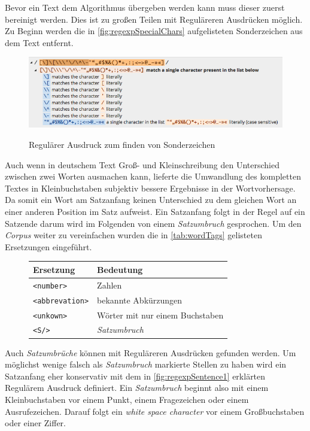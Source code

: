         Bevor ein Text dem Algorithmus übergeben werden kann muss dieser zuerst bereinigt werden. Dies ist zu großen Teilen mit Reguläreren Ausdrücken möglich. Zu Beginn werden die in \autoref{fig:regexpSpecialChars} aufgelisteten Sonderzeichen aus dem Text entfernt.
            
        \begin{figure}[H]
            \centering
            \includegraphics[width=0.8\linewidth]{images/regexpSpecialChars.png}
  			\caption{Regulärer Ausdruck zum finden von Sonderzeichen} \parencite{regex101:specialChars}
			\label{fig:regexpSpecialChars}
		\end{figure}
            
		Auch wenn in deutschem Text Groß- und Kleinschreibung den Unterschied zwischen zwei Worten ausmachen kann, lieferte die Umwandlung des kompletten Textes in Kleinbuchstaben subjektiv bessere Ergebnisse in der Wortvorhersage. Da somit ein Wort am Satzanfang keinen Unterschied zu dem gleichen Wort an einer anderen Position im Satz aufweist. Ein Satzanfang folgt in der Regel auf ein Satzende darum wird im Folgenden von einem \emph{Satzumbruch} gesprochen. Um den \emph{Corpus} weiter zu vereinfachen wurden die in \autoref{tab:wordTags} gelisteten Ersetzungen eingeführt.
        
		\begin{figure}[H]
			\centering
                
			\begin{tabular}{ l | l }
                Ersetzung & Bedeutung \\ \hline \hline
                \texttt{<number>} & Zahlen \\ \hline
                \texttt{<abbrevation>} & bekannte Abkürzungen \\ \hline
                \texttt{<unkown>} & Wörter mit nur einem Buchstaben \\ \hline
                \texttt{<S/>} & \emph{Satzumbruch}
            \end{tabular}
            \caption{ }
			\label{tab:wordTags}
		\end{figure}
            
        Auch \emph{Satzumbrüche} können mit Reguläreren Ausdrücken gefunden werden. Um möglichst wenige falsch als \emph{Satzumbruch} markierte Stellen zu haben wird ein Satzanfang eher konservativ mit dem in \autoref{fig:regexpSentence1} erklärten Regulärem Ausdruck definiert. Ein \emph{Satzumbruch} beginnt also mit einem Kleinbuchstaben vor einem Punkt, einem Fragezeichen oder einem Ausrufezeichen. Darauf folgt ein \emph{white space character} vor einem Großbuchstaben oder einer Ziffer.
            

